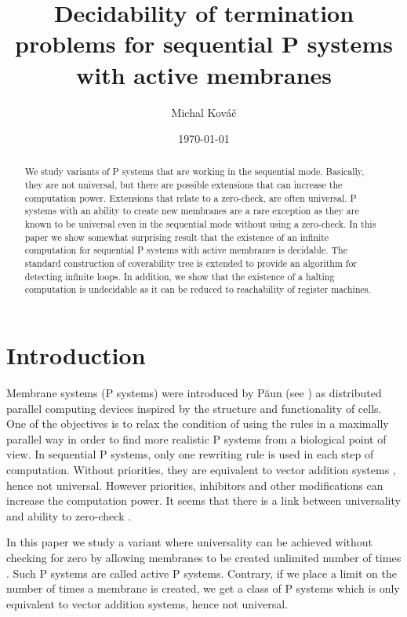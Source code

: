 \documentclass[llncs,submission,copyright,creativecommons]{../lib/lncs/llncs}
\begin{document}
\title{Decidability of termination problems for sequential P systems with active membranes}
\author{Michal Kováč}
\date{\today}
\maketitle

\begin{abstract}
We study variants of P systems that are working in the sequential mode. Basically, they are not universal, but there are possible extensions that can increase the computation power. Extensions that relate to a zero-check, are often universal.
P systems with an ability to create new membranes are a rare exception as they are known to be universal even in the sequential mode without using a zero-check.
In this paper we show somewhat surprising result that the existence of an infinite computation for sequential P systems with active membranes is decidable. The standard construction of coverability tree is extended to provide an algorithm for detecting infinite loops.
In addition, we show that the existence of a halting computation is undecidable as it can be reduced to reachability of register machines.
\end{abstract}

\section{Introduction}
\label{sec:introduction}


Membrane systems (P systems) were introduced by P\u{a}un (see \cite{Paun2000108}) as distributed parallel computing devices inspired by the structure and functionality of cells.
One of the objectives is to relax the condition of using the rules in a maximally parallel way in order to find more realistic P systems from a biological point of view.
In sequential P systems, only one rewriting rule is used in each step of computation. Without priorities, they are equivalent to vector addition systems \cite{Ibarra05Active}, hence not universal. However priorities, inhibitors and other modifications can increase the computation power. It seems that there is a link between universality and ability to zero-check \cite{Alhazov12Properties}.

In this paper we study a variant where universality can be achieved without checking for zero by allowing membranes to be created unlimited number of times \cite{Ibarra05Active}. Such P systems are called active P systems. Contrary, if we place a limit on the number of times a membrane is created, we get a class of P systems which is only equivalent to vector addition systems, hence not universal.
\end{document}
